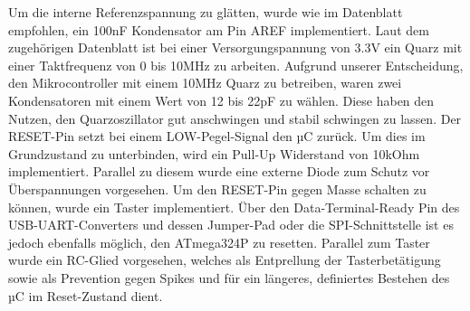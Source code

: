 Um die interne Referenzspannung zu glätten, wurde wie im Datenblatt empfohlen, ein 100nF Kondensator am Pin AREF implementiert.
Laut dem zugehörigen Datenblatt ist bei einer Versorgungspannung von 3.3V ein Quarz mit einer Taktfrequenz von 0 bis 10MHz zu arbeiten.
Aufgrund unserer Entscheidung, den Mikrocontroller mit einem 10MHz Quarz zu betreiben, waren zwei Kondensatoren mit einem Wert von 12 bis 22pF zu wählen.
Diese haben den Nutzen, den Quarzoszillator gut anschwingen und stabil schwingen zu lassen.
Der RESET-Pin setzt bei einem LOW-Pegel-Signal den µC zurück.
Um dies im Grundzustand zu unterbinden, wird ein Pull-Up Widerstand von 10kOhm implementiert.
Parallel zu diesem wurde eine externe Diode zum Schutz vor Überspannungen vorgesehen.
Um den RESET-Pin gegen Masse schalten zu können, wurde ein Taster implementiert.
Über den Data-Terminal-Ready Pin des USB-UART-Converters und dessen Jumper-Pad oder die SPI-Schnittstelle ist es jedoch ebenfalls möglich, den ATmega324P zu resetten.
Parallel zum Taster wurde ein RC-Glied vorgesehen, welches als Entprellung der Tasterbetätigung sowie als Prevention gegen Spikes und für ein längeres, definiertes Bestehen des µC im Reset-Zustand dient.

